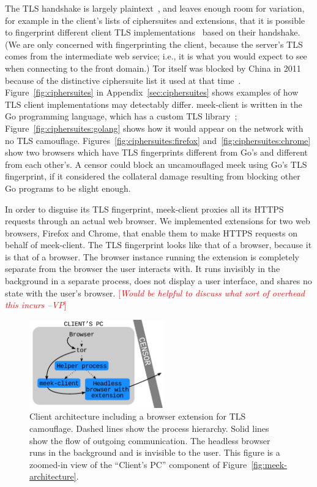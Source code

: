 \documentclass{sig-alternate}
\newcommand{\meekclient}{\mbox{meek-client}\xspace}
\newcommand{\meek}{meek\xspace}
\newcommand{\note}[1]{{\textcolor{red}{[\textit{#1}]}}}
\newcommand{\vp}[1]{\note{#1 --VP}}
\begin{document}
The TLS handshake is largely plaintext~\cite[\S7.4]{rfc5246}, and leaves
enough room for variation, for example in
the client's lists of ciphersuites and extensions,
that it is possible to fingerprint different client TLS implementations~\cite{ssl-p0f}
based on their handshake.
(We are only concerned with fingerprinting the client,
because the server's TLS
comes from the intermediate web service;
i.e., it is what you would expect to see when connecting to the front domain.)
Tor itself was blocked by China in 2011
because of the distinctive ciphersuite list it used at that time~\cite{bug4744}.
Figure~\ref{fig:ciphersuites} in Appendix~\ref{sec:ciphersuites} shows examples of how TLS client
implementations may detectably differ.
\meekclient is written in the Go programming language,
which has a custom TLS library~\cite{golang-crypto/tls};
Figure~\ref{fig:ciphersuites:golang}
shows how it would appear on the network with no TLS camouflage.
Figures~\ref{fig:ciphersuites:firefox} and~\ref{fig:ciphersuites:chrome}
show two browsers which have TLS fingerprints different from Go's
and different from each other's.
A censor could block an uncamouflaged \meek using Go's TLS fingerprint,
if it considered the collateral damage resulting from blocking other Go programs to be slight enough.

In order to disguise its TLS fingerprint,
\meekclient proxies all its HTTPS requests through an actual web browser.
We implemented extensions for two web browsers,
Firefox and Chrome,
that enable them to make HTTPS requests on behalf of \meekclient.
The TLS fingerprint looks like that of a browser, because it is that of a browser.
The browser instance running the extension is completely separate
from the browser the user interacts with.
It runs invisibly in the background in a separate process,
does not display a user interface,
and shares no state with the user's browser.
\vp{Would be helpful to discuss what sort of overhead this incurs}

\begin{figure}
\centering
\includegraphics[height=1.5in]{meek-browser-architecture}
\caption{
Client architecture including a browser extension for TLS camouflage.
Dashed lines show the process hierarchy.
Solid lines show the flow of outgoing communication.
The headless browser runs in the background and is invisible to the user.
This figure is a zoomed-in view of the ``Client's PC'' component of Figure~\ref{fig:meek-architecture}.
}
\label{fig:meek-browser-architecture}
\end{figure}
\end{document}
